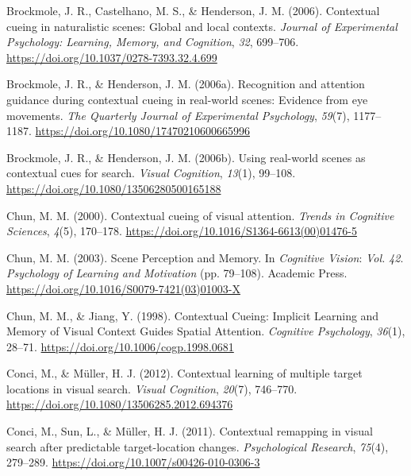 \documentclass[
  man,floatsintext]{apa7}
\newlength{\cslhangindent}
\newlength{\cslentryspacingunit} %
\newenvironment{CSLReferences}[2] %
 {%
  \setlength{\parindent}{0pt}
  \ifodd #1
  \let\oldpar\par
  \def\par{\hangindent=\cslhangindent\oldpar}
  \fi
  \setlength{\parskip}{#2\cslentryspacingunit}
 }%
 {}
\begin{document}
\begin{CSLReferences}{1}{0}
\leavevmode{}%
Brockmole, J. R., Castelhano, M. S., \& Henderson, J. M. (2006). Contextual cueing in naturalistic scenes: {Global} and local contexts. \emph{Journal of Experimental Psychology: Learning, Memory, and Cognition}, \emph{32}, 699--706. \url{https://doi.org/10.1037/0278-7393.32.4.699}

\leavevmode{}%
Brockmole, J. R., \& Henderson, J. M. (2006a). Recognition and attention guidance during contextual cueing in real-world scenes: {Evidence} from eye movements. \emph{The Quarterly Journal of Experimental Psychology}, \emph{59}(7), 1177--1187. \url{https://doi.org/10.1080/17470210600665996}

\leavevmode{}%
Brockmole, J. R., \& Henderson, J. M. (2006b). Using real-world scenes as contextual cues for search. \emph{Visual Cognition}, \emph{13}(1), 99--108. \url{https://doi.org/10.1080/13506280500165188}

\leavevmode{}%
Chun, M. M. (2000). Contextual cueing of visual attention. \emph{Trends in Cognitive Sciences}, \emph{4}(5), 170--178. \url{https://doi.org/10.1016/S1364-6613(00)01476-5}

\leavevmode{}%
Chun, M. M. (2003). Scene {Perception} and {Memory}. In \emph{Cognitive {Vision}}: \emph{Vol.} \emph{42}. \emph{Psychology of {Learning} and {Motivation}} (pp. 79--108). Academic Press. \url{https://doi.org/10.1016/S0079-7421(03)01003-X}

\leavevmode{}%
Chun, M. M., \& Jiang, Y. (1998). Contextual {Cueing}: {Implicit} {Learning} and {Memory} of {Visual} {Context} {Guides} {Spatial} {Attention}. \emph{Cognitive Psychology}, \emph{36}(1), 28--71. \url{https://doi.org/10.1006/cogp.1998.0681}

\leavevmode{}%
Conci, M., \& Müller, H. J. (2012). Contextual learning of multiple target locations in visual search. \emph{Visual Cognition}, \emph{20}(7), 746--770. \url{https://doi.org/10.1080/13506285.2012.694376}

\leavevmode{}%
Conci, M., Sun, L., \& Müller, H. J. (2011). Contextual remapping in visual search after predictable target-location changes. \emph{Psychological Research}, \emph{75}(4), 279--289. \url{https://doi.org/10.1007/s00426-010-0306-3}


\end{CSLReferences}
\end{document}
